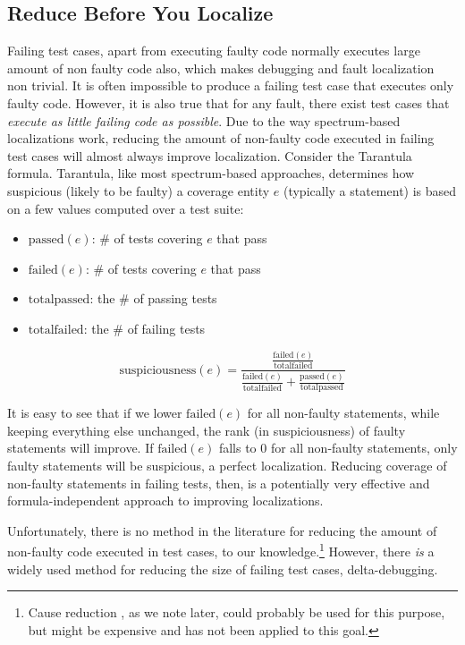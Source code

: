 \subsection{Reduce Before You Localize}

Failing test cases, apart from executing faulty code normally executes large amount of non faulty code also, which makes debugging and fault localization non trivial.  It is
often impossible to produce a failing test case that
executes only faulty code.  However, it is also true that for any
fault, there exist test cases that \emph{execute as little failing
code as possible}.  Due to the way spectrum-based localizations work,
reducing the amount of non-faulty code executed in failing test cases
will almost always improve localization.  Consider the Tarantula
\cite{Jones2002,Tarantula} formula.  Tarantula, like most spectrum-based
approaches, determines how suspicious (likely to be faulty) a coverage
entity $e$ (typically a statement) is based on a few values computed over
a test suite:

\begin{itemize}
\item $\text{passed}(e)$:  \# of tests covering $e$ that pass
\item $\text{failed}(e)$:  \# of tests covering $e$ that pass
\item $\text{totalpassed}$:  the \# of passing tests
\item $\text{totalfailed}$:  the \# of failing tests
\end{itemize}

$$ \text{suspiciousness}(e) =  \frac{\frac{\text{failed}(e)}{\text{totalfailed}}}{\frac{\text{failed}(e)}{\text{totalfailed}} + \frac{\text{passed}(e)}{\text{totalpassed}}}$$


It is easy to see that if we lower $\text{failed}(e)$ for all
non-faulty statements, while keeping everything else unchanged, the
rank (in suspiciousness) of faulty statements will improve.  If
$\text{failed}(e)$ falls to 0 for all non-faulty statements, only
faulty statements will be suspicious, a perfect localization.  Reducing coverage of non-faulty
statements in failing tests, then, is a potentially very effective  and
formula-independent approach to improving localizations.

Unfortunately, there is no method in the literature for reducing the
amount of non-faulty code executed in test cases, to our
knowledge.\footnote{Cause reduction \cite{icst2014}, as we note later,
could probably be used for this purpose, but might be expensive and
has not been applied to this goal.}  However, there \emph{is} a widely
used method for reducing the size of failing test cases, delta-debugging.

